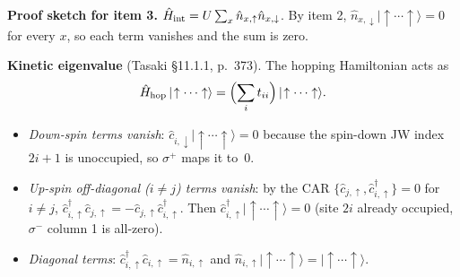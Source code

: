 \documentclass[a4paper,11pt]{article}
\begin{document}
\noindent\textbf{Proof sketch for item 3.}
$\hat H_{\rm int} = U\sum_x \hat n_{x,\uparrow}\hat n_{x,\downarrow}$.
By item 2, $\hat n_{x,\downarrow}|\!\uparrow\cdots\uparrow\rangle = 0$ for
every $x$, so each term vanishes and the sum is zero.

\noindent\textbf{Kinetic eigenvalue} (Tasaki §11.1.1, p.~373).
The hopping Hamiltonian acts as
\[
  \hat H_{\rm hop}\,|\!\uparrow\cdots\uparrow\rangle
  = \Bigl(\sum_i t_{ii}\Bigr)\,|\!\uparrow\cdots\uparrow\rangle.
\]
\begin{itemize}
  \item \emph{Down-spin terms vanish}: $\hat c_{i,\downarrow}|\!\uparrow\cdots\uparrow\rangle = 0$
    because the spin-down JW index $2i{+}1$ is unoccupied, so $\sigma^+$ maps it to~0.
  \item \emph{Up-spin off-diagonal ($i\neq j$) terms vanish}: by the CAR
    $\{\hat c_{j,\uparrow}, \hat c^\dagger_{i,\uparrow}\} = 0$ for $i\neq j$,
    $\hat c^\dagger_{i,\uparrow}\hat c_{j,\uparrow}
      = -\hat c_{j,\uparrow}\hat c^\dagger_{i,\uparrow}$.
    Then $\hat c^\dagger_{i,\uparrow}|\!\uparrow\cdots\uparrow\rangle = 0$
    (site $2i$ already occupied, $\sigma^-$ column 1 is all-zero).
  \item \emph{Diagonal terms}: $\hat c^\dagger_{i,\uparrow}\hat c_{i,\uparrow}
      = \hat n_{i,\uparrow}$ and $\hat n_{i,\uparrow}|\!\uparrow\cdots\uparrow\rangle
      = |\!\uparrow\cdots\uparrow\rangle$.
\end{itemize}
\end{document}
